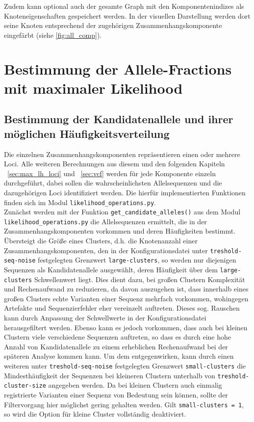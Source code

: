 Zudem kann optional auch der gesamte Graph mit den Komponentenindizes als Knoteneigenschaften gespeichert werden. In der visuellen Darstellung werden dort seine Knoten entsprechend der zugehörigen Zusammenhangskomponente eingefärbt (siehe \autoref{fig:all_comp}).\\

\section{Bestimmung der Allele-Fractions mit maximaler Likelihood} \label{sec:max_lh_allele}
\subsection{Bestimmung der Kandidatenallele und ihrer möglichen Häufigkeitsverteilung} \label{subsec:cand_allele}

Die einzelnen Zusammenhangskomponenten repräsentieren einen oder mehrere Loci. Alle weiteren Berechnungen aus diesem und den folgenden Kapiteln ~\ref{sec:max_lh_loci} und ~\ref{sec:vcf} werden für jede Komponente einzeln durchgeführt, dabei sollen die wahrscheinlichsten Allelsequenzen und die dazugehörigen Loci identifiziert werden. Die hierfür implementierten Funktionen finden sich im Modul \lstinline|likelihood_operations.py|. \\

Zunächst werden mit der Funktion \lstinline|get_candidate_alleles()| aus dem Modul \linebreak \lstinline|likelihood_operations.py| die Allelsequenzen ermittelt, die in der Zusammenhangskomponenten vorkommen und deren Häufigkeiten bestimmt. Übersteigt die Größe eines Clusters, d.h. die Knotenanzahl einer Zusammenhangskomponenten, den in der Konfigurationsdatei unter \lstinline|treshold-seq-noise| festgelegten Grenzwert \lstinline|large-clusters|, so werden nur diejenigen Sequenzen als Kandidatenallele ausgewählt, deren Häufigkeit über dem \lstinline|large-clusters| Schwellenwert liegt. Dies dient dazu, bei großen Clustern Komplexität und Rechenaufwand zu reduzieren, da davon auszugehen ist, dass innerhalb eines großen Clusters echte Varianten einer Sequenz mehrfach vorkommen, wohingegen Artefakte und Sequenzierfehler eher vereinzelt auftreten. Dieses sog. Rauschen kann durch Anpassung der Schwellwerte in der Konfigurationsdatei herausgefiltert werden. Ebenso kann es jedoch vorkommen, dass auch bei kleinen Clustern viele verschiedene Sequenzen auftreten, so dass es durch eine hohe Anzahl von Kandidatenallele zu einem erheblichen Rechenaufwand bei der späteren Analyse kommen kann. Um dem entgegenwirken, kann durch einen weiteren unter \lstinline|treshold-seq-noise| festgelegten Grenzwert \lstinline|small-clusters| die Mindesthäufigkeit der Sequenzen bei kleineren Clustern unterhalb von \lstinline|treshold-cluster-size| angegeben werden. Da bei kleinen Clustern auch einmalig registrierte Varianten einer Sequenz von Bedeutung sein können, sollte der Filtervorgang hier möglichst gering gehalten werden. Gilt \lstinline|small-clusters = 1|, so wird die Option für kleine Cluster vollständig deaktiviert. \\

